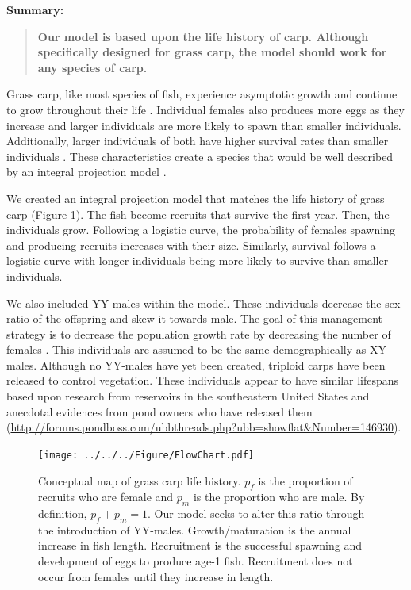 \documentclass{article}[12pt]
\begin{document}
\textbf{Summary:}
\begin{verse}
\textbf{
Our model is based upon the life history of carp.
Although specifically designed for grass carp, the model should work for any species of carp. 
} 
\end{verse}

Grass carp, like most species of fish, experience asymptotic growth and continue to grow throughout their life  \citep{lagler1962john}.
Individual females also produces more eggs as they increase and larger individuals are more likely to spawn than smaller individuals.
Additionally, larger individuals of both have higher survival rates than smaller individuals \citep{shireman1983synopsis}. 
These characteristics create a species that would be well described by an integral projection model \citep{ellner2006integral, ramula2009integral, merow2014advancing}.  

We created an integral projection model that matches the life history of grass carp (Figure \ref{fig:cMap}).
The fish become recruits that survive the first year.
Then, the individuals grow. 
Following a logistic curve, the probability of females spawning and producing recruits increases with their size. 
Similarly, survival follows a logistic curve with longer individuals being more likely to survive than smaller individuals.

We also included YY-males within the model.
These individuals decrease the sex ratio of the offspring and skew it towards male.
The goal of this management strategy is to decrease the population growth rate by decreasing the number of females \citep{schill2016production}. 
This individuals are assumed to be the same demographically as XY-males.
Although no YY-males have yet been created, triploid carps have been released to control vegetation.
These individuals appear to have similar lifespans based upon research from reservoirs in the southeastern United States \citep{kirk2003longevity} and anecdotal evidences from pond owners who have released them (\url{http://forums.pondboss.com/ubbthreads.php?ubb=showflat&Number=146930}).

\begin{figure}[htbp]
	\centering
	\texttt{[image: ../../../Figure/FlowChart.pdf]} 
	   \caption{Conceptual map of grass carp life history. \(p_f\) is the proportion of recruits who are female and \(p_m\) is the proportion who are male. By definition, \(p_f + p_m = 1\).  Our model seeks to alter this ratio through the introduction of YY-males. Growth/maturation is the annual increase in fish length. Recruitment is the successful spawning and development of eggs to produce age-1 fish. Recruitment does not occur from females until they increase in length.}
   \label{fig:cMap}
\end{figure}
\end{document}

